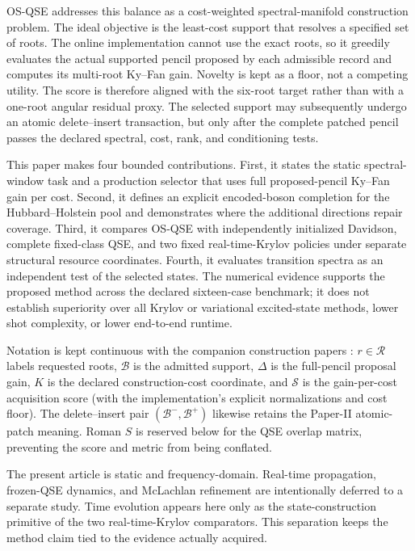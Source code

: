 \documentclass[
  reprint,
  amsmath,
  amssymb,
  aps,
  pra,
  nofootinbib,
  superscriptaddress,
  floatfix
]{revtex4-2}
\newcommand{\score}{\mathcal{S}}
\begin{document}
OS-QSE addresses this balance as a cost-weighted spectral-manifold
construction problem.  The ideal objective is the least-cost support that
resolves a specified set of roots.  The online implementation cannot use the
exact roots, so it greedily evaluates the actual supported pencil proposed by
each admissible record and computes its multi-root Ky--Fan gain.  Novelty is
kept as a floor, not a competing utility.  The score is therefore aligned
with the six-root target rather than with a one-root angular residual proxy.
The selected support may subsequently undergo an atomic delete--insert
transaction, but only after the complete patched pencil passes the declared
spectral, cost, rank, and conditioning tests.

This paper makes four bounded contributions.  First, it states the static
spectral-window task and a production selector that uses full proposed-pencil
Ky--Fan gain per cost.  Second, it defines an explicit encoded-boson
completion for the Hubbard--Holstein pool and demonstrates where the
additional directions repair coverage.  Third, it compares OS-QSE with
independently initialized Davidson, complete fixed-class QSE, and two fixed
real-time-Krylov policies under separate structural resource coordinates.
Fourth, it evaluates transition spectra as an independent test of the
selected states.  The numerical evidence supports the proposed method across
the declared sixteen-case benchmark; it does not establish superiority over
all Krylov or variational excited-state methods, lower shot complexity, or
lower end-to-end runtime.

Notation is kept continuous with the companion construction papers
\cite{PaperI,PaperII}: $r\in\mathcal R$ labels requested roots,
$\mathcal B$ is the admitted support, $\Delta$ is the full-pencil proposal gain,
$K$ is the declared construction-cost coordinate, and $\score$ is the
gain-per-cost acquisition score (with the implementation's explicit
normalizations and cost floor).  The delete--insert pair
$(\mathcal B^-,\mathcal B^+)$ likewise retains the Paper-II atomic-patch
meaning.  Roman $S$ is reserved below for the QSE overlap matrix, preventing
the score and metric from being conflated.

The present article is static and frequency-domain.  Real-time propagation,
frozen-QSE dynamics, and McLachlan refinement are intentionally deferred to a
separate study.  Time evolution appears here only as the state-construction
primitive of the two real-time-Krylov comparators.  This separation keeps the
method claim tied to the evidence actually acquired.
\end{document}
